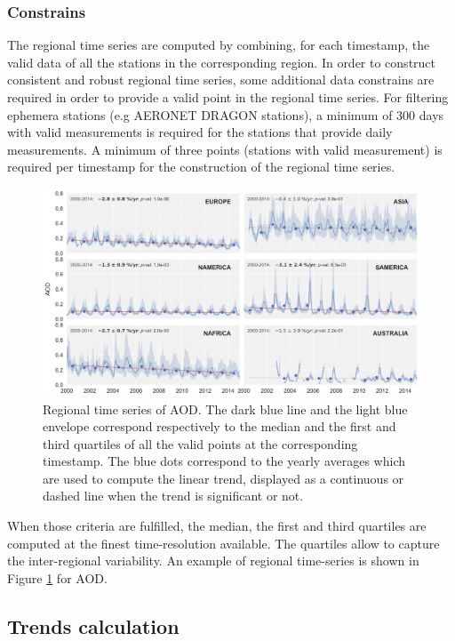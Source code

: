 \documentclass[journal abbreviation, manuscript]{copernicus}
\begin{document}
\subsubsection{Constrains}
The regional time series are computed by combining, for each timestamp, the valid data of all the stations in the corresponding region. In order to construct consistent and robust regional time series, some additional data constrains are required in order to provide a valid point in the regional time series. For filtering ephemera stations (e.g AERONET DRAGON stations), a minimum of 300 days with valid measurements is required for the stations that provide daily measurements. A minimum of three points (stations with valid measurement) is required per timestamp for the construction of the regional time series.

\begin{figure}
 \includegraphics[width=16cm]{../scripts/figs/ts/panel-od550aer.png}
 \caption{Regional time series of AOD. The dark blue line and the light blue envelope correspond respectively to the median and the first and third quartiles of all the valid points at the corresponding timestamp. The blue dots correspond to the yearly averages which are used to compute the linear trend, displayed as a continuous or dashed line when the trend is significant or not.}
 \label{fig:ts_aod}
\end{figure}

When those criteria are fulfilled, the median, the first and third quartiles are computed at the finest time-resolution available. The quartiles allow to capture the inter-regional variability. An example of regional time-series is shown in Figure \ref{fig:ts_aod} for AOD.


\subsection{Trends calculation}
\end{document}
